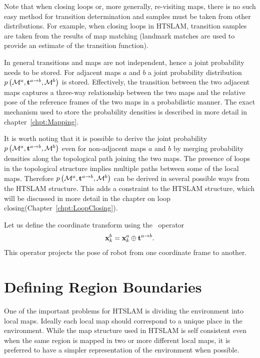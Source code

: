 Note that when closing loops or, more generally, re-visiting maps,
there is no such easy method for transition determination and samples
must be taken from other distributions. For example, when closing
loops in HTSLAM, transition samples are taken from the results of map
matching (landmark matches are used to provide an estimate of
the transition function).

In general transitions and maps are not independent,
hence a joint probability needs to be stored. For adjacent maps $a$
and $b$ a joint probability distribution
$\prob{\map{}{}{a},\tr{}{a}{b}, \map{}{}{b}}$ is stored. Effectively,
the transition between the two adjacent maps captures a three-way
relationship between the two maps and the relative pose of the
reference frames of the two maps in a probabilistic manner. The exact
mechanism used to store the probability densities is described in more
detail in chapter~\ref{chpt:Mapping}.

It is worth noting that it is possible to derive the joint
probability $\prob{\map{}{}{a},\tr{}{a}{b},\map{}{}{b}}$ even for
non-adjacent maps $a$ and $b$ by merging probability densities along
the topological path joining the two maps.  The presence of loops in
the topological structure implies multiple paths between some of the
local maps. Therefore $\prob{\map{}{}{a},\tr{}{a}{b},\map{}{}{b}}$ can
be derived in several possible ways from the HTSLAM structure. This
adds a constraint to the HTSLAM structure, which will be discussed in
more detail in the chapter on loop closing(Chapter~\ref{chpt:LoopClosing}).

Let us define the coordinate transform using the \transit\ operator
\begin{equation}
\x{k}{}{b} = \x{k}{}{a} \transit \tr{}{a}{b}.
\end{equation}
This operator projects the pose of robot from one coordinate frame to
another.


\section{Defining Region Boundaries}
\label{sec:region}

One of the important problems for HTSLAM is dividing the environment
into local maps. Ideally each local map should correspond to a unique
place in the environment. While the map structure used in HTSLAM is
self consistent even when the same region is mapped in two or more
different local maps, it is preferred to have a simpler representation
of the environment when possible.

